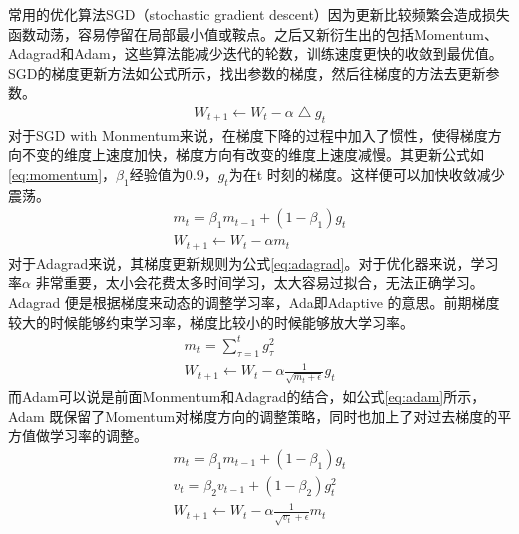 常用的优化算法SGD（stochastic gradient descent）因为更新比较频繁会造成损失函数动荡，容易停留在局部最小值或鞍点。之后又新衍生出的包括Momentum、Adagrad\cite{duchi2011adaptive}和Adam\cite{kingma2014adam}，这些算法能减少迭代的轮数，训练速度更快的收敛到最优值。
SGD的梯度更新方法如公式\label{eq:sgd}所示，找出参数的梯度，然后往梯度的方法去更新参数。
\begin{equation} \label{eq:sgd}
    \begin{split}
        W_{t+1}  \leftarrow W_{t} - \alpha \bigtriangleup g_{t}
    \end{split}
\end{equation}
对于SGD with Monmentum来说，在梯度下降的过程中加入了惯性，使得梯度方向不变的维度上速度加快，梯度方向有改变的维度上速度减慢。其更新公式如\ref{eq:momentum}，$\beta_{1}$经验值为0.9，$g_t$为在t 时刻的梯度。这样便可以加快收敛减少震荡。
\begin{equation}\label{eq:momentum}
    \begin{split}
        m_{t} = \beta_{1}m_{t-1} + (1-\beta_{1})g_{t} \\
        W_{t+1}  \leftarrow W_{t} - \alpha m_{t}
    \end{split}
\end{equation}
对于Adagrad来说，其梯度更新规则为公式\ref{eq:adagrad}。对于优化器来说，学习率$\alpha$ 非常重要，太小会花费太多时间学习，太大容易过拟合，无法正确学习。Adagrad 便是根据梯度来动态的调整学习率，Ada即Adaptive 的意思。前期梯度较大的时候能够约束学习率，梯度比较小的时候能够放大学习率。
\begin{equation} \label{eq:adagrad}
    \begin{split}
        m_{t} = \sum_{\tau=1}^{t}g_{\tau}^{2} \\
        W_{t+1}  \leftarrow W_{t} - \alpha \frac{1}{\sqrt{m_{t}+\epsilon}} g_{t}
    \end{split}
\end{equation}
而Adam可以说是前面Monmentum和Adagrad的结合，如公式\ref{eq:adam}所示，Adam 既保留了Momentum对梯度方向的调整策略，同时也加上了对过去梯度的平方值做学习率的调整。
\begin{equation} \label{eq:adam}
    \begin{split}
        m_{t} = \beta_{1}m_{t-1} + (1 - \beta_{1})g_{t} \\
        v_{t} = \beta_{2}v_{t-1} + (1 - \beta_{2})g_{t}^{2} \\
        W_{t+1}  \leftarrow W_{t} - \alpha \frac{1}{\sqrt{v_{t}}+\epsilon}m_{t}
    \end{split}
\end{equation}

